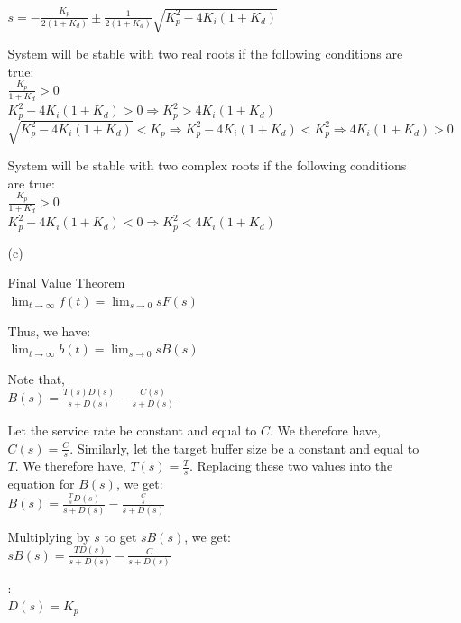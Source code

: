 \documentclass{article}
\begin{document}
\begin{enumerate}
\begin{itemize}
\noindent $s = -{\frac{K_p}{2(1+K_d)}} \pm {\frac{1}{2(1+K_d)}}
\sqrt{K_p^2 - 4K_i(1+K_d)}$ \bigbreak

\noindent System will be stable with two real roots if the
following conditions are true:\\
\noindent ${\frac{K_p}{1+K_d}} > 0$\\
\noindent $K_p^2 - 4K_i(1+K_d) > 0 \Rightarrow K_p^2 > 4K_i(1+K_d)$\\
\noindent $\sqrt{K_p^2 - 4K_i(1+K_d)} < K_p \Rightarrow K_p^2 -
4K_i(1+K_d) < K_p^2 \Rightarrow 4K_i(1+K_d) > 0$ \bigbreak

\noindent System will be stable with two complex roots if the
following conditions are true:\\
\noindent ${\frac{K_p}{1+K_d}} > 0$\\
\noindent $K_p^2 - 4K_i(1+K_d) < 0 \Rightarrow K_p^2 <
4K_i(1+K_d)$


\bigbreak \bigbreak

\item[(c)] \smallbreak

\noindent Final Value Theorem\\
\noindent $\lim_{t \to \infty} f(t) = \lim_{s \to 0} sF(s)$
\bigbreak

\noindent Thus, we have:\\
\noindent $\lim_{t \to \infty} b(t) = \lim_{s \to 0} sB(s)$
\bigbreak

\noindent Note that,\\
\noindent $B(s) = {\frac{T(s) D(s)}{s + D(s)}} - {\frac{C(s)}{s +
D(s)}}$ \bigbreak

\noindent Let the service rate be constant and equal to $C$. We
therefore have, $C(s) = {\frac{C}{s}}$. Similarly, let the target
buffer size be a constant and equal to $T$. We therefore have,
$T(s) = {\frac{T}{s}}$. Replacing these two values into the
equation for $B(s)$, we get:\\
\noindent $B(s) = {\frac{{\frac{T}{s}} D(s)}{s + D(s)}} -
{\frac{\frac{C}{s}}{s + D(s)}}$ \bigbreak

\noindent Multiplying by $s$ to get $sB(s)$, we get:\\
\noindent $sB(s) = {\frac{T D(s)}{s + D(s)}} - {\frac{C}{s +
D(s)}}$

\bigbreak \bigbreak

:\\
\noindent $D(s) = K_p$\\


\end{itemize}
\end{enumerate}
\end{document}
